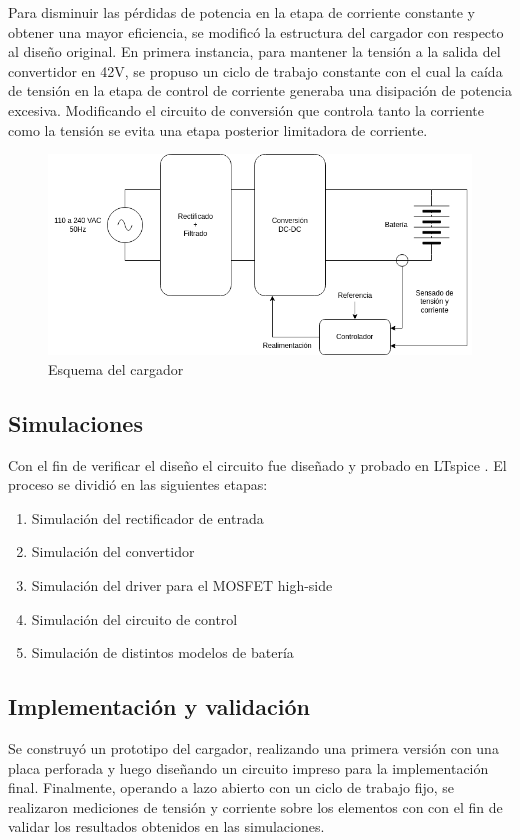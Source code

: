 Para disminuir las pérdidas de potencia en la etapa de corriente constante y obtener una mayor eficiencia, se modificó la estructura del cargador con respecto al diseño original. 
En primera instancia, para mantener la tensión a la salida del convertidor en 42V, se propuso un ciclo de trabajo constante 
con el cual la caída de tensión en la etapa de control de corriente generaba una disipación de potencia excesiva.
Modificando el circuito de conversión que controla tanto la corriente como la tensión se evita una etapa posterior limitadora de corriente.

\begin{figure}
    \centering
    \includegraphics[width=\textwidth]{images/esquema_cargador_v2.png}
    \caption{Esquema del cargador}
    \label{fig:esquema_cargador}
\end{figure}

\subsection{Simulaciones}
Con el fin de verificar el diseño el circuito fue diseñado y probado en LTspice \cite{ltspice}.
El proceso se dividió en las siguientes etapas:
\begin{enumerate}
    \item Simulación del rectificador de entrada
    \item Simulación del convertidor
    \item Simulación del driver para el MOSFET high-side
    \item Simulación del circuito de control
    \item Simulación de distintos modelos de batería
\end{enumerate}

\subsection{Implementación y validación}
Se construyó un prototipo del cargador, realizando una primera versión con una placa perforada
y luego diseñando un circuito impreso para la implementación final.
Finalmente, operando a lazo abierto con un ciclo de trabajo fijo, se realizaron mediciones de tensión y corriente sobre los elementos con
con el fin de validar los resultados obtenidos en las simulaciones.
